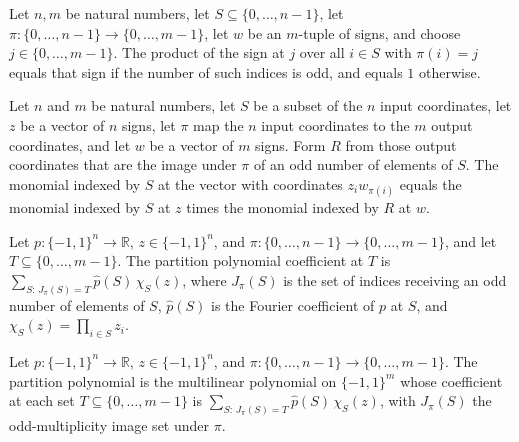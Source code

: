 \begin{theorem}
\label{FABL.fiberSignProduct_eq_ite_odd}
\leanok
{}
Let $n,m$ be natural numbers, let $S\subseteq\{0,\ldots,n-1\}$, let
$\pi:\{0,\ldots,n-1\}\to\{0,\ldots,m-1\}$, let $w$ be an $m$-tuple of signs, and choose
$j\in\{0,\ldots,m-1\}$. The product of the sign at $j$ over all $i\in S$ with $\pi(i)=j$
equals that sign if the number of such indices is odd, and equals $1$ otherwise.
\end{theorem}

\begin{theorem}
\label{FABL.monomial_partitionInput}
\leanok
{}
Let $n$ and $m$ be natural numbers, let $S$ be a subset of the $n$ input coordinates,
let $z$ be a vector of $n$ signs, let $\pi$ map the $n$ input coordinates to the $m$
output coordinates, and let $w$ be a vector of $m$ signs. Form $R$ from those output
coordinates that are the image under $\pi$ of an odd number of elements of $S$. The
monomial indexed by $S$ at the vector with coordinates $z_iw_{\pi(i)}$ equals the
monomial indexed by $S$ at $z$ times the monomial indexed by $R$ at $w$.
\end{theorem}

\begin{definition}
\label{FABL.partitionPolynomialCoefficient}
\leanok
{}
Let $p:\{−1,1\}^n\to\mathbb R$, $z\in\{−1,1\}^n$, and
$\pi:\{0,\ldots,n-1\}\to\{0,\ldots,m-1\}$, and let $T\subseteq\{0,\ldots,m-1\}$. The
partition polynomial coefficient at $T$ is $\sum_{S:\,J_\pi(S)=T}\widehat
p(S)\,\chi_S(z)$, where $J_\pi(S)$ is the set of indices receiving an odd number of
elements of $S$, $\widehat p(S)$ is the Fourier coefficient of $p$ at $S$, and
$\chi_S(z)=\prod_{i\in S}z_i$.
\end{definition}

\begin{definition}
\label{FABL.partitionPolynomial}
\leanok
{}
Let $p:\{−1,1\}^n\to\mathbb R$, $z\in\{−1,1\}^n$, and
$\pi:\{0,\ldots,n-1\}\to\{0,\ldots,m-1\}$. The partition polynomial is the multilinear
polynomial on $\{−1,1\}^m$ whose coefficient at each set $T\subseteq\{0,\ldots,m-1\}$ is
$\sum_{S:\,J_\pi(S)=T}\widehat p(S)\,\chi_S(z)$, with $J_\pi(S)$ the odd-multiplicity
image set under $\pi$.
\end{definition}

